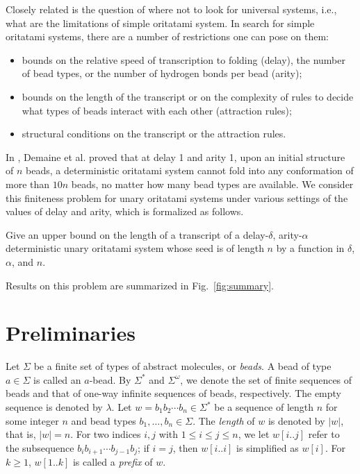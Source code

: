 \documentclass[runningheads]{llncs}
\begin{document}
Closely related is the question of where not to look for universal systems, i.e., what are the limitations of simple oritatami system. 
In search for simple oritatami systems, there are a number of restrictions one can pose on them:
\begin{itemize}
\item bounds on the relative speed of transcription to folding (delay), the number of bead types, or the number of hydrogen bonds per bead (arity);
\item bounds on the length of the transcript or on the complexity of rules to decide what types of beads interact with each other (attraction rules);
\item structural conditions on the transcript or the attraction rules.
\end{itemize}
%
In \cite{DHOPRSST2018}, Demaine et al. proved that at delay 1 and arity 1, upon an initial structure of $n$ beads, a deterministic oritatami system cannot fold into any conformation of more than $10n$ beads, no matter how many bead types are available. 
We consider this finiteness problem for unary oritatami systems under various settings of the values of delay and arity, which is formalized as follows. 

\begin{problem}\label{prob:det_unary_length}
Give an upper bound on the length of a transcript of a delay-$\delta$, arity-$\alpha$ deterministic unary oritatami system whose seed is of length $n$ by a function in $\delta$, $\alpha$, and $n$. 
\end{problem}



Results on this problem are summarized in Fig.~\ref{fig:summary}. 


	\section{Preliminaries}\label{sec:preliminaries}

Let $\Sigma$ be a finite set of types of abstract molecules, or \textit{beads}. 
A bead of type $a \in \Sigma$ is called an $a$-bead. 
By $\Sigma^*$ and $\Sigma^\omega$, we denote the set of finite sequences of beads and that of one-way infinite sequences of beads, respectively. 
The empty sequence is denoted by $\lambda$. 
Let $w = b_1 b_2 \cdots b_n \in \Sigma^*$ be a sequence of length $n$ for some integer $n$ and bead types $b_1, \ldots, b_n \in \Sigma$. 
The \textit{length} of $w$ is denoted by $|w|$, that is, $|w| = n$. 
For two indices $i, j$ with $1 \le i \le j \le n$, we let $w[i..j]$ refer to the subsequence $b_i b_{i+1} \cdots b_{j-1}b_j$; if $i = j$, then $w[i..i]$ is simplified as $w[i]$. 
For $k \ge 1$, $w[1..k]$ is called a \textit{prefix} of $w$. 
\end{document}
